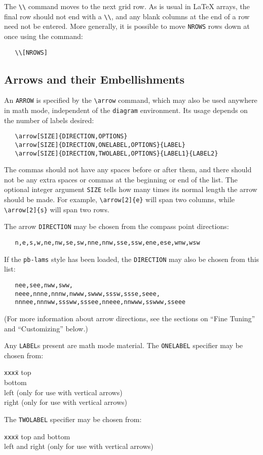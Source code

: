 \documentclass[12pt]{article}\usepackage{pb-diagram}
\begin{document}
The \verb"\\" command moves to the next grid row.  As is usual in 
\LaTeX{} arrays, the final row should not end with a \verb"\\", and 
any blank columns at the end of a row need not be entered.  More 
generally, it is possible to move \verb"NROWS" rows down at once 
using the command:
\begin{verbatim}
   \\[NROWS]
\end{verbatim}

\subsection{Arrows and their Embellishments}

An \verb"ARROW" is specified by the \verb"\arrow" command, which may 
also be used anywhere in math mode, independent of the
\verb"diagram" environment.  Its usage depends on the number of 
labels desired:
\begin{verbatim}
   \arrow[SIZE]{DIRECTION,OPTIONS}
   \arrow[SIZE]{DIRECTION,ONELABEL,OPTIONS}{LABEL}
   \arrow[SIZE]{DIRECTION,TWOLABEL,OPTIONS}{LABEL1}{LABEL2}
\end{verbatim}
The commas should not have any spaces before or after them, and there 
should not be any extra spaces or commas at the beginning or end of 
the list.  The optional integer argument \verb"SIZE" tells how many 
times its normal length the arrow should be made.  For example, 
\verb"\arrow[2]{e}" will span two columns, while \verb"\arrow[2]{s}" 
will span two rows.

The arrow \verb"DIRECTION" may be chosen from the compass point 
directions:  
\begin{verbatim}
   n,e,s,w,ne,nw,se,sw,nne,nnw,sse,ssw,ene,ese,wnw,wsw
\end{verbatim}
If the \verb"pb-lams" style has been loaded, the \verb"DIRECTION"
may also be chosen from this list:
\begin{verbatim}
   nee,see,nww,sww,
   neee,nnne,nnnw,nwww,swww,sssw,ssse,seee,
   nnnee,nnnww,sssww,sssee,nneee,nnwww,sswww,sseee
\end{verbatim}
(For more information about arrow directions, see the sections
on ``Fine Tuning'' and ``Customizing'' below.)

Any \verb"LABEL"s present are math mode material.  The 
\verb"ONELABEL" specifier may be chosen from:
\begin{tabbing}
   {\tt xxx}\={\tt x}\qquad\=\kill
   \> top\\
   \>  bottom\\
   \>  left (only for use with vertical arrows)\\
   \>  right (only for use with vertical arrows)
\end{tabbing}
The \verb"TWOLABEL" specifier may be chosen from:
\begin{tabbing}
   {\tt xxx}\={\tt x}\qquad\=\kill
   \>  top and bottom\\
   \>  left and right (only for use with vertical arrows)
\end{tabbing}
\end{document}
